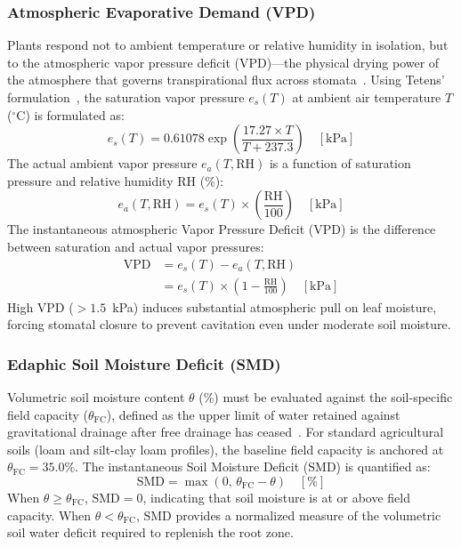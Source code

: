 \subsubsection{Atmospheric Evaporative Demand (VPD)}
Plants respond not to ambient temperature or relative humidity in isolation, but to the atmospheric vapor pressure deficit (VPD)---the physical drying power of the atmosphere that governs transpirational flux across stomata~\cite{monteith1965evaporation}. Using Tetens' formulation~\cite{tetens1930uber}, the saturation vapor pressure $e_s(T)$ at ambient air temperature $T$ ($^{\circ}\text{C}$) is formulated as:
\begin{equation}
e_s(T) = 0.61078 \exp\left( \frac{17.27 \times T}{T + 237.3} \right) \quad [\text{kPa}]
\label{eq:tetens_es}
\end{equation}
The actual ambient vapor pressure $e_a(T, \text{RH})$ is a function of saturation pressure and relative humidity $\text{RH}$ (\%):
\begin{equation}
e_a(T, \text{RH}) = e_s(T) \times \left( \frac{\text{RH}}{100} \right) \quad [\text{kPa}]
\label{eq:tetens_ea}
\end{equation}
The instantaneous atmospheric Vapor Pressure Deficit ($\text{VPD}$) is the difference between saturation and actual vapor pressures:
\begin{align}
\text{VPD} &= e_s(T) - e_a(T, \text{RH}) \nonumber \\
&= e_s(T) \times \left( 1 - \frac{\text{RH}}{100} \right) \quad [\text{kPa}]
\label{eq:vpd}
\end{align}
High VPD ($>1.5$~kPa) induces substantial atmospheric pull on leaf moisture, forcing stomatal closure to prevent cavitation even under moderate soil moisture.

\subsubsection{Edaphic Soil Moisture Deficit (SMD)}
Volumetric soil moisture content $\theta$ (\%) must be evaluated against the soil-specific field capacity ($\theta_{\text{FC}}$), defined as the upper limit of water retained against gravitational drainage after free drainage has ceased~\cite{allen1998crop}. For standard agricultural soils (loam and silt-clay loam profiles), the baseline field capacity is anchored at $\theta_{\text{FC}} = 35.0\%$. The instantaneous Soil Moisture Deficit ($\text{SMD}$) is quantified as:
\begin{equation}
\text{SMD} = \max\left(0, \, \theta_{\text{FC}} - \theta\right) \quad [\%]
\label{eq:smd}
\end{equation}
When $\theta \ge \theta_{\text{FC}}$, $\text{SMD} = 0$, indicating that soil moisture is at or above field capacity. When $\theta < \theta_{\text{FC}}$, $\text{SMD}$ provides a normalized measure of the volumetric soil water deficit required to replenish the root zone.

